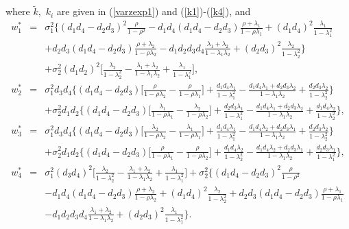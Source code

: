 \begin{appendix}
where $\widetilde{k}, \,\,k_i$ are given in (\ref{varzexp1}) and (\ref{k1})-(\ref{k4}), and
\begin{eqnarray*}
w_1^*&=&\sigma_1^2\Big\{(d_1d_4-d_2d_3)^2\frac{\rho}{1-\rho^2}-d_1d_4(d_1d_4-d_2d_3)\frac{\rho+\lambda_1}{1-\rho\lambda_1}+(d_1d_4)^2\frac{\lambda_1}{1-\lambda_1^2}\nonumber\\
                          &&+d_2d_3(d_1d_4-d_2d_3)\frac{\rho+\lambda_2}{1-\rho\lambda_2}-d_1d_2d_3d_4\frac{\lambda_1+\lambda_2}{1-\lambda_1\lambda_2}+(d_2d_3)^2\frac{\lambda_2}{1-\lambda_2^2}\Big\}\nonumber\\
                          &&+\sigma_2^2(d_1d_2)^2\Big
[\frac{\lambda_2}{1-\lambda_2^2}-\frac{\lambda_1+\lambda_2}{1-\lambda_1\lambda_2}+\frac{\lambda_1}{1-\lambda_1^2}\Big],\label{w1star}\\
 w_2^*&=&\sigma_1^2d_3d_4\Big\{(d_1d_4-d_2d_3)\Big[\frac{\rho}{1-\rho\lambda_2}-\frac{\rho}{1-\rho\lambda_1}\Big]+\frac{d_1d_4\lambda_1}{1-\lambda_1^2}-\frac{d_1d_4\lambda_1+d_2d_3\lambda_2}{1-\lambda_1\lambda_2}+\frac{d_2d_3\lambda_2}{1-\lambda_2^2}\Big\}\nonumber\\
                         &&+\sigma_2^2d_1d_2\Big\{(d_1d_4-d_2d_3)\Big[\frac{\lambda_1}{1-\rho\lambda_1}-\frac{\lambda_2}{1-\rho\lambda_2}\Big]+\frac{d_2d_3\lambda_1}{1-\lambda_1^2}-\frac{d_1d_4\lambda_1+d_2d_3\lambda_2}{1-\lambda_1\lambda_2}+\frac{d_1d_4\lambda_2}{1-\lambda_2^2}\Big\},\label{w2star}\\
 w_3^*&=&\sigma_1^2d_3d_4\Big\{(d_1d_4-d_2d_3)\Big[\frac{\lambda_2}{1-\rho\lambda_2}-\frac{\lambda_1}{1-\rho\lambda_1}\Big]+\frac{d_1d_4\lambda_1}{1-\lambda_1^2}-\frac{d_1d_4\lambda_2+d_2d_3\lambda_1}{1-\lambda_1\lambda_2}+\frac{d_2d_3\lambda_2}{1-\lambda_2^2}\Big\}\nonumber\\
                         &&+\sigma_2^2d_1d_2\Big\{(d_1d_4-d_2d_3)\Big[\frac{\rho}{1-\rho\lambda_1}-\frac{\rho}{1-\rho\lambda_2}\Big]+\frac{d_1d_4\lambda_2}{1-\lambda_2^2}-\frac{d_1d_4\lambda_2+d_2d_3\lambda_1}{1-\lambda_1\lambda_2}+\frac{d_2d_3\lambda_1}{1-\lambda_1^2}\Big\},\label{w3star}\\
 w_4^*&=&\sigma_1^2(d_3d_4)^2\Big
[\frac{\lambda_2}{1-\lambda_2^2}-\frac{\lambda_1+\lambda_2}{1-\lambda_1\lambda_2}+\frac{\lambda_1}{1-\lambda_1^2}\Big]+\sigma_2^2\Big\{(d_1d_4-d_2d_3)^2\frac{\rho}{1-\rho^2}\nonumber\\
&&-d_1d_4(d_1d_4-d_2d_3)\frac{\rho+\lambda_2}{1-\rho\lambda_2}+(d_1d_4)^2\frac{\lambda_2}{1-\lambda_2^2}+d_2d_3(d_1d_4-d_2d_3)\frac{\rho+\lambda_1}{1-\rho\lambda_1}\nonumber\\
                          &&-d_1d_2d_3d_4\frac{\lambda_1+\lambda_2}{1-\lambda_1\lambda_2}+(d_2d_3)^2\frac{\lambda_1}{1-\lambda_1^2}\Big\}.\label{w4star}
\end{eqnarray*}



\end{appendix}
